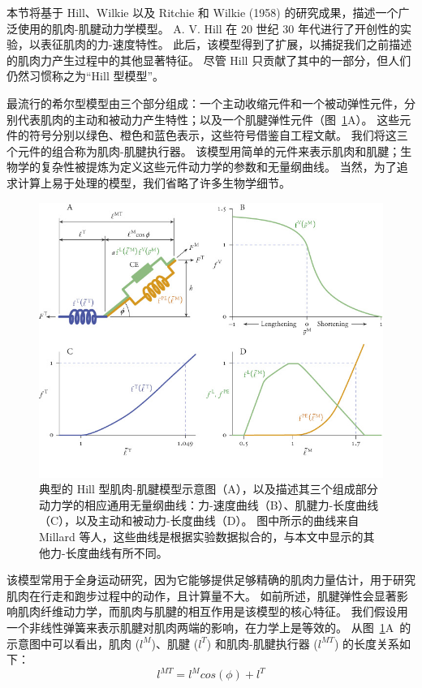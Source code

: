 本节将基于 Hill\cite{hill1938heat}、Wilkie \cite{wilkie1956mechanical} 以及 Ritchie 和 Wilkie (1958) 的研究成果，描述一个广泛使用的肌肉-肌腱动力学模型。
A. V. Hill 在 20 世纪 30 年代进行了开创性的实验，以表征肌肉的力-速度特性。
此后，该模型得到了扩展，以捕捉我们之前描述的肌肉力产生过程中的其他显著特征。
尽管 Hill 只贡献了其中的一部分，但人们仍然习惯称之为“Hill 型模型”。


最流行的希尔型模型由三个部分组成：一个主动收缩元件和一个被动弹性元件，分别代表肌肉的主动和被动力产生特性；以及一个肌腱弹性元件（图~\ref{fig:5_11}A）。
这些元件的符号分别以绿色、橙色和蓝色表示，这些符号借鉴自工程文献。
我们将这三个元件的组合称为肌肉-肌腱执行器。
该模型用简单的元件来表示肌肉和肌腱；生物学的复杂性被提炼为定义这些元件动力学的参数和无量纲曲线。
当然，为了追求计算上易于处理的模型，我们省略了许多生物学细节。


\begin{figure}[!htb]
	\centering
	\includegraphics[width=0.75\linewidth]{chap5/5_11}
	\caption{典型的 Hill 型肌肉-肌腱模型示意图（A），以及描述其三个组成部分动力学的相应通用无量纲曲线：力-速度曲线（B）、肌腱力-长度曲线（C），以及主动和被动力-长度曲线（D）。
		图中所示的曲线来自 Millard 等人\cite{millard2013flexing}，这些曲线是根据实验数据拟合的，与本文中显示的其他力-长度曲线有所不同。 \label{fig:5_11}}
\end{figure}


该模型常用于全身运动研究，因为它能够提供足够精确的肌肉力量估计，用于研究肌肉在行走和跑步过程中的动作，且计算量不大。
如前所述，肌腱弹性会显著影响肌肉纤维动力学，而肌肉与肌腱的相互作用是该模型的核心特征。
我们假设用一个非线性弹簧来表示肌腱对肌肉两端的影响，在力学上是等效的。
从图~\ref{fig:5_11}A~的示意图中可以看出，肌肉 ($l^M$)、肌腱 ($l^T$) 和肌肉-肌腱执行器 ($l^{MT}$) 的长度关系如下：
\begin{equation}
	l^{MT} = l^M cos(\phi) + l^T
\end{equation}


